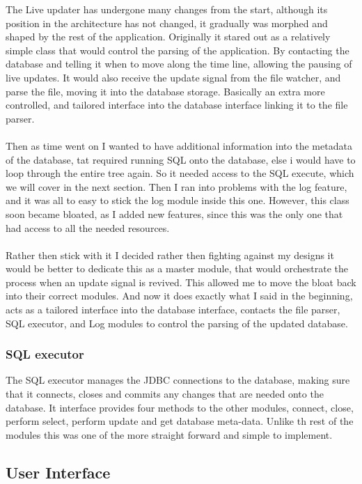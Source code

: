The Live updater has undergone many changes from the start, although its position in the architecture has not changed, it gradually was morphed and shaped by the rest of the application. Originally it stared out as a relatively simple class that would control the parsing of the application. By contacting the database and telling it when to move along the time line, allowing the pausing of live updates. It would also receive the update signal from the file watcher, and parse the file, moving it into the database storage. Basically an extra more controlled, and tailored interface into the database interface linking it to the file parser.
\\\\
Then as time went on I wanted to have additional information into the metadata of the database, tat required running SQL onto the database, else i would have to loop through the entire tree again. So it needed access to the SQL execute, which we will cover in the next section. Then I ran into problems with the log feature, and it was all to easy to stick the log module inside this one. However, this class soon became bloated, as I added new features, since this was the only one that had access to all the needed resources.
\\\\
Rather then stick with it I decided rather then fighting against my designs it would be better to dedicate this as a master module, that would orchestrate the process when an update signal is revived. This allowed me to move the bloat back into their correct modules. And now it does exactly what I said in the beginning, acts as a tailored interface into the database interface, contacts the file parser, SQL executor, and Log modules to control the parsing of the updated database.

\subsubsection{SQL executor}
\label{subsubsec:sql_executor_imp}

The SQL executor manages the JDBC connections to the database, making sure that it connects, closes and commits any changes that are needed onto the database. It interface provides four methods to the other modules, connect, close, perform select, perform update and get database meta-data. Unlike th rest of the modules this was one of the more straight forward and simple to implement.

\subsection{User Interface}
\label{subsec:user_interface_imp}

